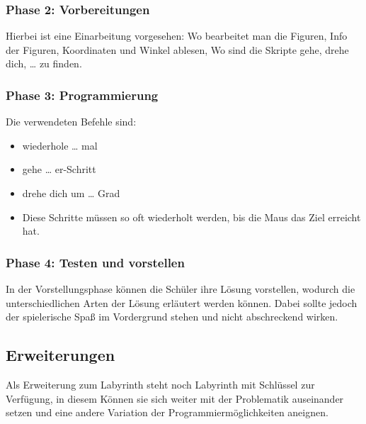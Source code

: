 \subsubsection{Phase 2: Vorbereitungen}\label{phase-2-vorbereitungen}

Hierbei ist eine Einarbeitung vorgesehen: Wo bearbeitet man die Figuren,
Info der Figuren, Koordinaten und Winkel ablesen, Wo sind die Skripte
gehe, drehe dich, \ldots{} zu finden.

\subsubsection{Phase 3: Programmierung}\label{phase-3-programmierung}

Die verwendeten Befehle sind:

\begin{itemize}
\tightlist
\item
  wiederhole \ldots{} mal
\item
  gehe \ldots{} er-Schritt
\item
  drehe dich um \ldots{} Grad
\item
  Diese Schritte müssen so oft wiederholt werden, bis die Maus das Ziel
  erreicht hat.
\end{itemize}

\subsubsection{Phase 4: Testen und
vorstellen}\label{phase-4-testen-und-vorstellen}

In der Vorstellungsphase können die Schüler ihre Lösung vorstellen,
wodurch die unterschiedlichen Arten der Lösung erläutert werden können.
Dabei sollte jedoch der spielerische Spaß im Vordergrund stehen und
nicht abschreckend wirken.

\subsection{Erweiterungen}\label{erweiterungen}

Als Erweiterung zum Labyrinth steht noch Labyrinth mit Schlüssel zur
Verfügung, in diesem Können sie sich weiter mit der Problematik
auseinander setzen und eine andere Variation der
Programmiermöglichkeiten aneignen.
